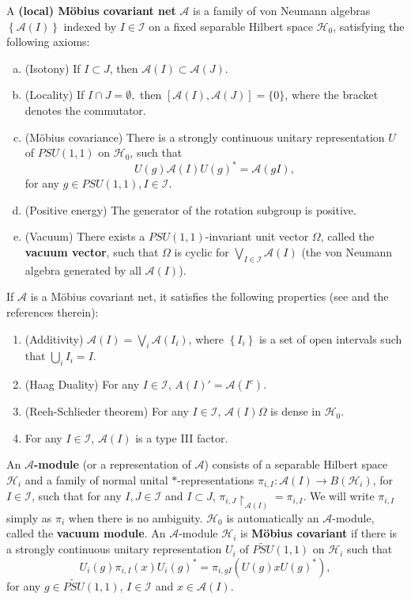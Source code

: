 \documentclass{article}
\newcommand{\hilb}{\mathcal{H}}
\newcommand{\A}{\mathcal{A}}
\begin{document}
A \textbf{(local) M\"{o}bius covariant net} $\A$  is a family of von Neumann algebras $\left\{ \A(I)\right\}$ indexed by $I \in \mathcal{I}$ on a fixed separable Hilbert space $\hilb_0$, satisfying the following axioms:
\begin{enumerate}[(a)]
    \item (Isotony) If $I \subset J$, then $\A(I) \subset \A(J). $
    \item (Locality) If $I \cap J = \emptyset,$ then $[\A(I), \A(J)] = \{0\}$, where the bracket denotes the commutator. 
    \item (M\"{o}bius covariance) There is a strongly continuous  unitary representation $U$ of $PSU(1,1)$ on $\hilb_0$, such that 
    \[
    U(g) \A(I) U(g)^* = \A(gI),
    \]
    for any $g\in PSU(1,1), I \in \mathcal{I}$. 
   \item (Positive energy) The generator of the rotation subgroup is positive.
   \item (Vacuum) There exists a $PSU(1,1)$-invariant unit vector $\Omega$, called the \textbf{vacuum vector}, such that 
   $\Omega$ is cyclic for $\bigvee_{I\in\mathcal{I}}\A(I)$ (the von Neumann algebra generated by all $\A(I)$).
\end{enumerate}


If $\A$ is a M\"{o}bius covariant net, it satisfies the following properties (see \cite{guido1996conformal} and the references therein):
\begin{enumerate}
    \item (Additivity) $\A(I) = \bigvee_i \A(I_i)$, where $\left\{ I_i\right\}$ is a set of open intervals such that 
    $\bigcup_i I_i = I$. 
    \item (Haag Duality) For any $I\in\mathcal{I}$, $A(I)' = \A(I^c)$.
    \item (Reeh-Schlieder theorem) For any $I\in\mathcal{I}$, $\A(I)\Omega$ is dense in $\hilb_0$. 
    \item For any $I \in \mathcal{I}$, $\A(I)$ is a type III factor. 
\end{enumerate}

An \textbf{$\A$-module} (or a representation of $\A$) consists of a separable Hilbert space 
$\hilb_i$ and a family of normal unital $*$-representations $\pi_{i,I}: \A(I) \to B(\hilb_i)$, for $I\in\mathcal{I}$, 
such that for any $I, J \in \mathcal{I}$ and $I\subset J$, 
$\pi_{i,J} \restriction_{\A(I)} = \pi_{i,I}$. We will write $\pi_{i,I}$ simply as $\pi_i$ when there is no ambiguity.
$\hilb_0$ is automatically an $\A$-module, called the \textbf{vacuum module}. An $\A$-module $\hilb_i$
is \textbf{ M\"{o}bius covariant} if  there is a strongly continuous unitary representation 
$U_i$ of $\widetilde{PSU}(1,1)$ on $\hilb_i$ such
that 
\[U_i(g)\pi_{i,I}(x)U_i(g)^* = \pi_{i,gI}(U(g)xU(g)^*), \] for any $g\in\widetilde{PSU}(1,1)$, $I\in\mathcal{I}$ and $x\in\A(I)$. 
\end{document}
